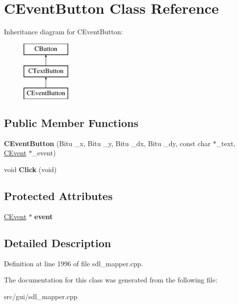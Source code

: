 \hypertarget{classCEventButton}{\section{C\-Event\-Button Class Reference}
\label{classCEventButton}
}
Inheritance diagram for C\-Event\-Button\-:\begin{figure}[H]
\begin{center}
\leavevmode
\includegraphics[height=3.000000cm]{classCEventButton}
\end{center}
\end{figure}
\subsection*{Public Member Functions}
\begin{DoxyCompactItemize}
\item 
\hypertarget{classCEventButton_a79fd3e96e7f7f1b3c4565f02535c3429}{{\bfseries C\-Event\-Button} (Bitu \-\_\-x, Bitu \-\_\-y, Bitu \-\_\-dx, Bitu \-\_\-dy, const char $\ast$\-\_\-text, \hyperlink{classCEvent}{C\-Event} $\ast$\-\_\-event)}\label{classCEventButton_a79fd3e96e7f7f1b3c4565f02535c3429}

\item 
\hypertarget{classCEventButton_ab88a51cd41e89b95cc7fbb7d78562fbe}{void {\bfseries Click} (void)}\label{classCEventButton_ab88a51cd41e89b95cc7fbb7d78562fbe}

\end{DoxyCompactItemize}
\subsection*{Protected Attributes}
\begin{DoxyCompactItemize}
\item 
\hypertarget{classCEventButton_a5f0d42f7b82112c4b144f84f308f1527}{\hyperlink{classCEvent}{C\-Event} $\ast$ {\bfseries event}}\label{classCEventButton_a5f0d42f7b82112c4b144f84f308f1527}

\end{DoxyCompactItemize}


\subsection{Detailed Description}


Definition at line 1996 of file sdl\-\_\-mapper.\-cpp.



The documentation for this class was generated from the following file\-:\begin{DoxyCompactItemize}
\item 
src/gui/sdl\-\_\-mapper.\-cpp\end{DoxyCompactItemize}
